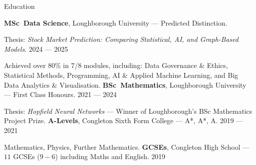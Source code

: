 \begin{rubric}{Education}

\entry*[]%
  \textbf{MSc~Data Science}, Loughborough University — Predicted Distinction. 
  \par Thesis: \emph{Stock Market Prediction: Comparing Statistical, AI, and Graph-Based Models}. \hspace{3.2cm} 2024 — 2025
  \par Achieved over $80\%$ in $7/8$ modules, including: Data Governance \& Ethics, Statistical Methods, \newline Programming, AI \& Applied Machine Learning, and Big Data Analytics \& Visualisation.
\entry*[]%
  \textbf{BSc~Mathematics}, Loughborough University — First Class Honours. \hfill 2021 — 2024
  \par Thesis: \emph{Hopfield Neural Networks} — Winner of Loughborough's BSc Mathematics Project Prize.
\entry*[]%
  \textbf{A-Levels}, Congleton Sixth Form College — A*, A*, A. \hspace{7.5cm} 2019 — 2021
  \par Mathematics, Physics, Further Mathematics.
\entry*[]%
  \textbf{GCSEs}, Congleton High School — $11$ GCSEs ($9-6$) including Maths and English. \hspace{4.3cm} 2019
\end{rubric}
